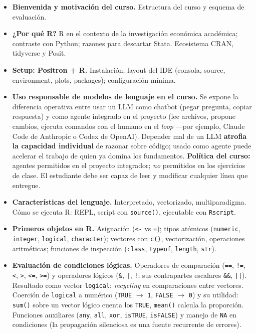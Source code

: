 \documentclass[11pt,letterpaper]{article}
\newcommand{\blue}[1]{{\color{cerulean}#1}}
\newcommand{\orange}[1]{{\color{redorange}#1}}
\begin{document}
\begin{itemize}[leftmargin=*, itemsep=2pt]
    \item \textbf{Bienvenida y motivación del curso.} Estructura del curso y esquema de evaluación.
    \item \textbf{¿Por qué R?} R en el contexto de la investigación económica académica; contraste con Python; razones para descartar Stata. Ecosistema CRAN, tidyverse y Posit.
    \item \textbf{Setup: Positron + R.} Instalación; layout del IDE (consola, source, environment, plots, packages); configuración mínima.
    \item \textbf{Uso responsable de modelos de lenguaje en el curso.} Se expone la diferencia operativa entre usar un LLM como \blue{chatbot} (pegar pregunta, copiar respuesta) y como \orange{agente integrado en el proyecto} (lee archivos, propone cambios, ejecuta comandos con el humano en el \textit{loop} ---por ejemplo, Claude Code de Anthropic o Codex de OpenAI). Depender mal de un LLM \textbf{atrofia la capacidad individual} de razonar sobre código; usado como agente puede acelerar el trabajo de quien ya domina los fundamentos. \textbf{Política del curso:} agentes permitidos en el proyecto integrador; \textit{no} permitidos en los ejercicios de clase. El estudiante debe ser capaz de leer y modificar cualquier línea que entregue.
    \item \textbf{Características del lenguaje.} Interpretado, vectorizado, multiparadigma. Cómo se ejecuta R: REPL, script con \texttt{source()}, ejecutable con \texttt{Rscript}.
    \item \textbf{Primeros objetos en R.} Asignación (\texttt{<-} vs \texttt{=}); tipos atómicos (\texttt{numeric}, \texttt{integer}, \texttt{logical}, \texttt{character}); vectores con \texttt{c()}, vectorización, operaciones aritméticas; funciones de inspección (\texttt{class}, \texttt{typeof}, \texttt{length}, \texttt{str}).
    \item \textbf{Evaluación de condiciones lógicas.} Operadores de comparación (\texttt{==}, \texttt{!=}, \texttt{<}, \texttt{>}, \texttt{<=}, \texttt{>=}) y operadores lógicos (\texttt{\&}, \texttt{|}, \texttt{!}; sus contrapartes escalares \texttt{\&\&}, \texttt{||}). Resultado como vector \texttt{logical}; \textit{recycling} en comparaciones entre vectores. Coerción de \texttt{logical} a numérico (\texttt{TRUE} $\to$ \texttt{1}, \texttt{FALSE} $\to$ \texttt{0}) y su utilidad: \texttt{sum()} sobre un vector lógico cuenta los \texttt{TRUE}, \texttt{mean()} calcula la proporción. Funciones auxiliares (\texttt{any}, \texttt{all}, \texttt{xor}, \texttt{isTRUE}, \texttt{isFALSE}) y manejo de \texttt{NA} en condiciones (la propagación silenciosa es una fuente recurrente de errores).
\end{itemize}
\end{document}
